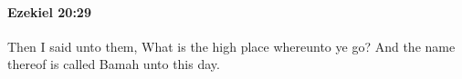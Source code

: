 
		\paragraph{Ezekiel 20:29} %
			\label{EZEKIEL-20-29}

			Then I said unto them, What is the high place whereunto ye go? And the name thereof is called Bamah unto this day.


